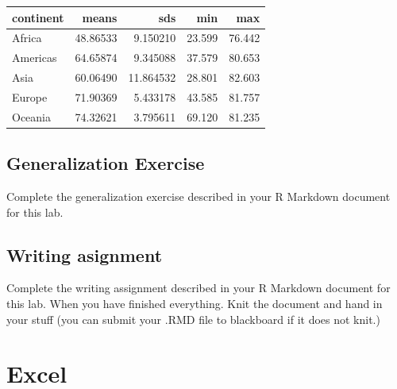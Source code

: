 \documentclass[]{book}
\newenvironment{Shaded}{\begin{snugshade}}{\end{snugshade}}
\newcommand{\KeywordTok}[1]{\textcolor[rgb]{0.13,0.29,0.53}{\textbf{{#1}}}}
\newcommand{\DataTypeTok}[1]{\textcolor[rgb]{0.13,0.29,0.53}{{#1}}}
\newcommand{\StringTok}[1]{\textcolor[rgb]{0.31,0.60,0.02}{{#1}}}
\newcommand{\NormalTok}[1]{{#1}}
\theoremstyle{definition}
\theoremstyle{definition}
\theoremstyle{definition}
\theoremstyle{remark}
\begin{document}
\begin{Shaded}
\end{Shaded}

\begin{tabular}{l|r|r|r|r}
\hline
continent & means & sds & min & max\\
\hline
Africa & 48.86533 & 9.150210 & 23.599 & 76.442\\
\hline
Americas & 64.65874 & 9.345088 & 37.579 & 80.653\\
\hline
Asia & 60.06490 & 11.864532 & 28.801 & 82.603\\
\hline
Europe & 71.90369 & 5.433178 & 43.585 & 81.757\\
\hline
Oceania & 74.32621 & 3.795611 & 69.120 & 81.235\\
\hline
\end{tabular}

\subsection{Generalization Exercise}\label{generalization-exercise}

Complete the generalization exercise described in your R Markdown
document for this lab.

\subsection{Writing asignment}\label{writing-asignment}

Complete the writing assignment described in your R Markdown document
for this lab. When you have finished everything. Knit the document and
hand in your stuff (you can submit your .RMD file to blackboard if it
does not knit.)

\section{Excel}\label{excel-1}
\end{document}
